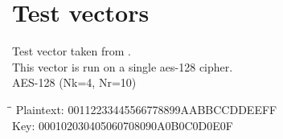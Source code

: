 \chapter{Test vectors}

Test vector taken from \citet[pp. 35--36]{AES:2001}. \\
This vector is run on a single aes-128 cipher. \\
AES-128 (Nk=4, Nr=10) \\
\begin{tabbing}
  \hspace*{3cm}\=\hspace*{3cm}\= \kill
  Plaintext: \> 00112233445566778899AABBCCDDEEFF \\
  Key: \> 000102030405060708090A0B0C0D0E0F \\
\end{tabbing}

